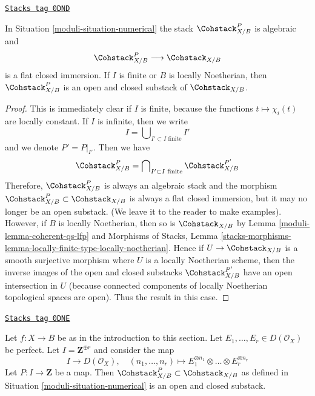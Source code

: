 \begin{lemma}[Open P]
\label{moduli-lemma-open-P}
\href{https://stacks.math.columbia.edu/tag/0DND}{\texttt{Stacks tag 0DND}}

In Situation \ref{moduli-situation-numerical} the stack
$\Cohstack^P_{X/B}$ is algebraic and
$$
\Cohstack^P_{X/B} \longrightarrow \Cohstack_{X/B}
$$
is a flat closed immersion. If $I$ is finite or $B$ is locally
Noetherian, then $\Cohstack^P_{X/B}$ is an open and closed substack of
$\Cohstack_{X/B}$.
\end{lemma}

\begin{proof}

This is immediately clear if $I$ is finite, because the functions
$t \mapsto \chi_i(t)$ are locally constant. If $I$ is infinite, then
we write
$$
I = \bigcup\nolimits_{I' \subset I\text{ finite}} I'
$$
and we denote $P' = P|_{I'}$. Then we have
$$
\Cohstack^P_{X/B} = \bigcap\nolimits_{I' \subset I\text{ finite}}
\Cohstack^{P'}_{X/B}
$$
Therefore, $\Cohstack^P_{X/B}$ is always an algebraic stack and the morphism
$\Cohstack^P_{X/B} \subset \Cohstack_{X/B}$ is always a flat closed immersion,
but it may no longer be an open substack. (We leave it to the reader to
make examples). However, if $B$ is locally Noetherian, then so
is $\Cohstack_{X/B}$ by Lemma \ref{moduli-lemma-coherent-qs-lfp} and
Morphisms of Stacks, Lemma
\ref{stacks-morphisms-lemma-locally-finite-type-locally-noetherian}.
Hence if $U \to \Cohstack_{X/B}$ is a smooth surjective morphism
where $U$ is a locally Noetherian scheme, then the inverse images of
the open and closed substacks $\Cohstack^{P'}_{X/B}$
have an open intersection in $U$ (because connected components of
locally Noetherian topological spaces are open).
Thus the result in this case.
\end{proof}

\begin{lemma}
\label{moduli-lemma-finite-list-perfect-objects}
\href{https://stacks.math.columbia.edu/tag/0DNE}{\texttt{Stacks tag 0DNE}}

Let $f : X \to B$ be as in the introduction to this section.
Let $E_1, \ldots, E_r \in D(\mathcal{O}_X)$ be perfect.
Let $I = \mathbf{Z}^{\oplus r}$ and consider the map
$$
I \longrightarrow D(\mathcal{O}_X),\quad
(n_1, \ldots, n_r) \longmapsto
E_1^{\otimes n_1}
\otimes \ldots \otimes
E_r^{\otimes n_r}
$$
Let $P : I \to \mathbf{Z}$ be a map. Then
$\Cohstack^P_{X/B} \subset \Cohstack_{X/B}$
as defined in Situation \ref{moduli-situation-numerical}
is an open and closed substack.
\end{lemma}


